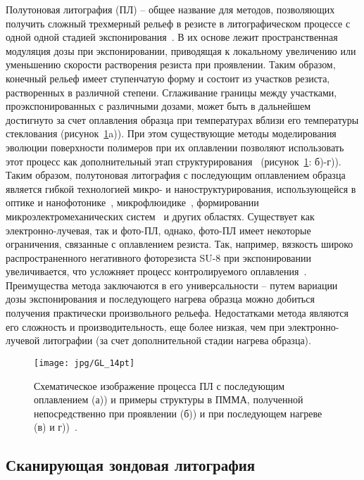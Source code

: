 Полутоновая литография (ПЛ) -- общее название для методов, позволяющих получить сложный трехмерный рельеф в резисте в литографическом процессе с одной одной стадией экспонирования~\cite{GL_general}. В их основе лежит пространственная модуляция дозы при экспонировании, приводящая к локальному увеличению или уменьшению скорости растворения резиста при проявлении. Таким образом, конечный рельеф имеет ступенчатую форму и состоит из участков резиста, растворенных в различной степени. Сглаживание границы между участками, проэкспонированных с различными дозами, может быть в дальнейшем достигнуто за счет оплавления образца при температурах вблизи его температуры стеклования (рисунок~\ref{fig:GL}a)). При этом существующие методы моделирования эволюции поверхности полимеров при их оплавлении позволяют использовать этот процесс как дополнительный этап структурирования~\cite{Kirchner_reflow} (рисунок~\ref{fig:GL}: б)-г)). Таким образом, полутоновая литография с последующим оплавлением образца является гибкой технологией микро- и наноструктурирования, использующейся в оптике и нанофотонике~\cite{GL_optics}, микрофлюидике~\cite{GL_microfluidics}, формировании микроэлектромеханических систем~\cite{GL_MEMS} и других областях. Существует как электронно-лучевая, так и фото-ПЛ, однако, фото-ПЛ имеет некоторые ограничения, связанные с оплавлением резиста. Так, например, вязкость широко распространенного негативного фоторезиста SU-8 при экспонировании увеличивается, что усложняет процесс контролируемого оплавления~\cite{Kirchner_GL_review}. Преимущества метода заключаются в его универсальности -- путем вариации дозы экспонирования и последующего нагрева образца можно добиться получения практически произвольного рельефа. Недостатками метода являются его сложность и производительность, еще более низкая, чем при электронно-лучевой литографии (за счет дополнительной стадии нагрева образца).

\begin{figure}
	\centering
	\texttt{[image: jpg/GL\_14pt]}
	\caption{Схематическое изображение процесса ПЛ с последующим оплавлением (а)) и примеры структуры в ПММА, полученной непосредственно при проявлении (б)) и при последующем нагреве (в) и г))~\cite{Kirchner_reflow}.}
	\label{fig:GL}
\end{figure}


\subsection{Сканирующая зондовая литография}


